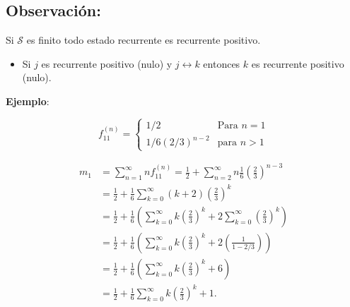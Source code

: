 \documentclass[12pt,a4paper]{article}
\begin{document}
\subsection*{Observación:}
Si $\mathcal{S}$ es finito todo estado recurrente es recurrente positivo.

\begin{itemize}
    \item Si $j$ es recurrente positivo (nulo) y $j \leftrightarrow k$ entonces $k$ es recurrente positivo (nulo).
\end{itemize}

\textbf{Ejemplo}:

\begin{center}
\end{center}

\begin{equation*}
f_{11}^{(n)} = \begin{cases}
1/2 & \text{Para } n=1 \\
1/6 (2/3)^{n-2} & \text{para } n>1
\end{cases}
\end{equation*}

\begin{align*}
m_1 &= \sum_{n=1}^{\infty} n f_{11}^{(n)} = \frac{1}{2} + \sum_{n=2}^{\infty} n \frac{1}{6} \left(\frac{2}{3}\right)^{n-3} \\
&= \frac{1}{2} + \frac{1}{6} \sum_{k=0}^{\infty} (k+2) \left(\frac{2}{3}\right)^k \\
&= \frac{1}{2} + \frac{1}{6} \left(\sum_{k=0}^{\infty} k \left(\frac{2}{3}\right)^k + 2 \sum_{k=0}^{\infty} \left(\frac{2}{3}\right)^k\right) \\
&= \frac{1}{2} + \frac{1}{6} \left(\sum_{k=0}^{\infty} k \left(\frac{2}{3}\right)^k + 2 \left(\frac{1}{1 - 2/3}\right)\right) \\
&= \frac{1}{2} + \frac{1}{6} \left(\sum_{k=0}^{\infty} k \left(\frac{2}{3}\right)^k + 6\right) \\
&= \frac{1}{2} + \frac{1}{6} \sum_{k=0}^{\infty} k \left(\frac{2}{3}\right)^k + 1.
\end{align*}
\end{document}
